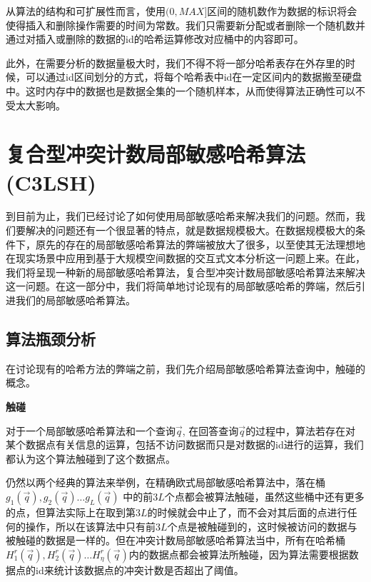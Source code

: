 	从算法的结构和可扩展性而言，使用$ (0, MAX] $区间的随机数作为数据的标识将会使得插入和删除操作需要的时间为常数。我们只需要新分配或者删除一个随机数并通过对插入或删除的数据的id的哈希运算修改对应桶中的内容即可。
	
	此外，在需要分析的数据量极大时，我们不得不将一部分哈希表存在外存里的时候，可以通过id区间划分的方式，将每个哈希表中id在一定区间内的数据搬至硬盘中。这时内存中的数据也是数据全集的一个随机样本，从而使得算法正确性可以不受太大影响。
 

\section{复合型冲突计数局部敏感哈希算法(C3LSH)}
\label{C3LSH}

到目前为止，我们已经讨论了如何使用局部敏感哈希来解决我们的问题。然而，我们要解决的问题还有一个很显著的特点，就是数据规模极大。在数据规模极大的条件下，原先的存在的局部敏感哈希算法的弊端被放大了很多，以至使其无法理想地在现实场景中应用到基于大规模空间数据的交互式文本分析这一问题上来。在此，我们将呈现一种新的局部敏感哈希算法，复合型冲突计数局部敏感哈希算法来解决这一问题。在这一部分中，我们将简单地讨论现有的局部敏感哈希的弊端，然后引进我们的局部敏感哈希算法。

\subsection{算法瓶颈分析}

在讨论现有的哈希方法的弊端之前，我们先介绍局部敏感哈希算法查询中，触碰的概念。

\begin{definition}
	{\bf 触碰}
	
	对于一个局部敏感哈希算法和一个查询$ \vec{q} $, 在回答查询$ \vec{q} $的过程中，算法若存在对某个数据点有关信息的运算，包括不访问数据而只是对数据的id进行的运算，我们都认为这个算法触碰到了这个数据点。
	
\end{definition}

仍然以两个经典的算法来举例，在精确欧式局部敏感哈希算法中，落在桶$ g_1(\vec{q}),g_2(\vec{q}) \dots g_L(\vec{q}) $ 中的前$ 3L $个点都会被算法触碰，虽然这些桶中还有更多的点，但算法实际上在取到第$ 3L $的时候就会中止了，而不会对其后面的点进行任何的操作，所以在该算法中只有前$ 3L $个点是被触碰到的，这时候被访问的数据与被触碰的数据是一样的。但在冲突计数局部敏感哈希算法当中，所有在哈希桶$ H^r_1(\vec{q}),H^r_2(\vec{q}) \dots H^r_\eta(\vec{q}) $内的数据点都会被算法所触碰，因为算法需要根据数据点的id来统计该数据点的冲突计数是否超出了阈值。

